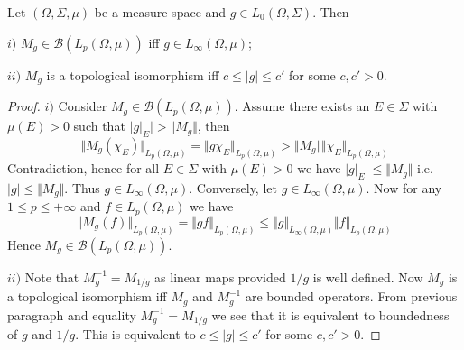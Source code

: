 \begin{proposition}\label{MultpOpPropIfPeqqualsQ} Let $(\Omega,\Sigma,\mu)$ be a measure space and $g\in L_0(\Omega,\Sigma)$. Then 

$i)$ $M_g\in\mathcal{B}(L_p(\Omega,\mu))$ iff $g\in L_\infty(\Omega,\mu)$;

$ii)$ $M_g$ is a topological isomorphism iff $c\leq |g|\leq c'$ for some $c,c'>0$.
\end{proposition}
\begin{proof}
$i)$ Consider $M_g\in\mathcal{B}(L_p(\Omega,\mu))$. Assume there exists an $E\in\Sigma$ with $\mu(E)>0$ such that $|g|_E|>\Vert M_g\Vert$, then
$$
\Vert M_g(\chi_E)\Vert_{L_p(\Omega,\mu)}
=\Vert g\chi_E\Vert_{L_p(\Omega,\mu)}
>\Vert M_g\Vert\Vert\chi_E\Vert_{L_p(\Omega,\mu)}
$$
Contradiction, hence for all $E\in\Sigma$ with $\mu(E)>0$ we have $|g|_E|\leq \Vert M_g\Vert$ i.e.  $|g|\leq \Vert M_g\Vert$. Thus $g\in L_\infty(\Omega,\mu)$. Conversely, let $g\in L_\infty(\Omega,\mu)$. Now for any $1\leq p\leq +\infty$ and $f\in L_p(\Omega,\mu)$ we have
$$
\Vert M_g(f)\Vert_{L_p(\Omega,\mu)}
=\Vert g  f\Vert_{L_p(\Omega,\mu)}
\leq \Vert g\Vert_{L_\infty(\Omega,\mu)}\Vert f\Vert_{L_p(\Omega,\mu)}
$$
Hence $M_g\in\mathcal{B}(L_p(\Omega,\mu))$.

$ii)$ Note that $M_g^{-1}=M_{1/g}$ as linear maps provided $1/g$ is well defined. Now $M_g$ is a topological isomorphism iff $M_g$ and $M_g^{-1}$ are bounded operators. From previous paragraph and equality $M_g^{-1}=M_{1/g}$ we see that it is equivalent to boundedness of $g$ and $1/g$. This is equivalent to $c\leq|g|\leq c'$ for some $c,c'>0$.
\end{proof}

